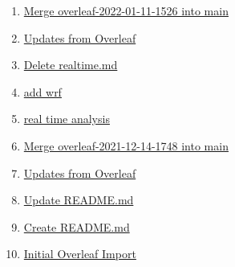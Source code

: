 \begin{enumerate}
\item  \href{http://github.com/cyberaide/NIST-analytics/commit/0e4dd12b11d895bded6de7a1530f72e774933cbf}{Merge overleaf-2022-01-11-1526 into main}
\item  \href{http://github.com/cyberaide/NIST-analytics/commit/5ec710512be4c2512652771339c29cf1aa18df4d}{Updates from Overleaf}
\item  \href{http://github.com/cyberaide/NIST-analytics/commit/afe421ffea425883062fe9cafbad9c876a833c92}{Delete realtime.md}
\item  \href{http://github.com/cyberaide/NIST-analytics/commit/acb6e9c8b1fe144c80afa6c725f0bd9793f3d0e0}{add wrf}
\item  \href{http://github.com/cyberaide/NIST-analytics/commit/578ee1923df65968a4996b37b0deb8c0558a5691}{real time analysis}
\item  \href{http://github.com/cyberaide/NIST-analytics/commit/706ebbce394a688cb38b4a73ab7132bf2d2dbd8f}{Merge overleaf-2021-12-14-1748 into main}
\item  \href{http://github.com/cyberaide/NIST-analytics/commit/f9a0ab646916a0de795afb8e144ec67dc617ab5d}{Updates from Overleaf}
\item  \href{http://github.com/cyberaide/NIST-analytics/commit/e3091a355f5d17c6cbbf17575673cbf35def8ffc}{Update README.md}
\item  \href{http://github.com/cyberaide/NIST-analytics/commit/2d8f7ca9e2a6ea85a3e4ba072aac3f8b9380914b}{Create README.md}
\item  \href{http://github.com/cyberaide/NIST-analytics/commit/dfbddcff1caa6513223638cdc9e243e23cd9843c}{Initial Overleaf Import}
\end{enumerate}
